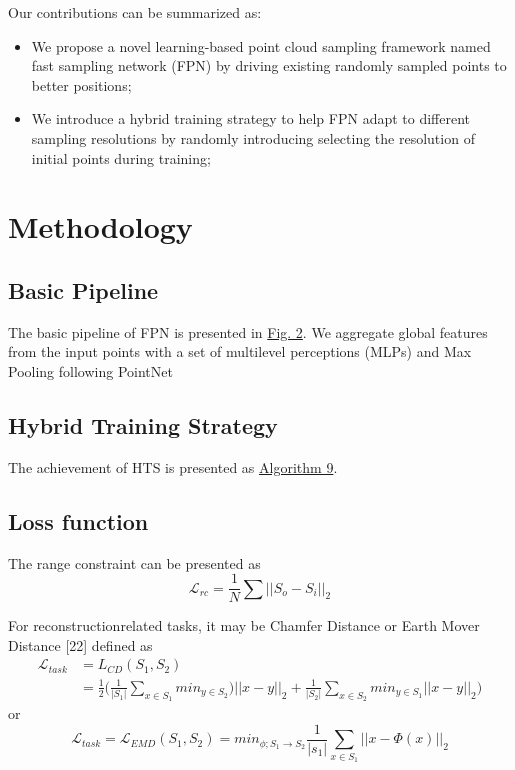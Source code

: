 \documentclass[14pt]{article}
\begin{document}
\begin{multicols}{2}
Our contributions can be summarized as:
\begin{itemize}
	\item We propose a novel learning-based point cloud sampling
framework named fast sampling network (FPN) by driving existing randomly sampled points to better positions;
    \item We introduce a hybrid training strategy to help FPN adapt to
different sampling resolutions by randomly introducing selecting the resolution of initial points during training;
\end{itemize}

\section{Methodology}
\subsection{Basic Pipeline}
The basic pipeline of FPN is presented in \href{fig:fig2}{Fig. 2}. We aggregate global features from the input points with a set of multilevel perceptions (MLPs) and Max Pooling following PointNet \cite{qi2017pointnet}

\subsection{Hybrid Training Strategy}
The achievement of HTS is presented as \href{alg:1}{Algorithm 9}.
\subsection{Loss function}
The range constraint can be presented as
\begin{equation}
	\mathcal{L}_{rc}=\frac{1}{N}\sum||S_o-S_i||_2
\end{equation}

For reconstructionrelated tasks, it may be Chamfer Distance or Earth Mover Distance [22] defined as\\

\begin{equation}
\begin{split}
	\mathcal{L}_{task}&=L_{CD}(S_1,S_2)\\
	&=\frac{1}{2}\Biggl(\frac{1}{|S_1|}\sum_{x\in S_1} min_{y\in S_2})||x-y||_2+\frac{1}{|S_2|}\sum_{x\in S_2}min_{y\in S_1}||x-y||_2\Biggr)
\end{split}
\end{equation}
or
\begin{equation}
	\mathcal{L}_{task}=\mathcal{L}_{EMD}(S_1,S_2)=min_{\phi ;S_1\rightarrow S_2}\frac{1}{|s_1|}\sum_{x \in S_1}||x-\Phi(x)||_2
\end{equation}


\end{multicols}
\end{document}
